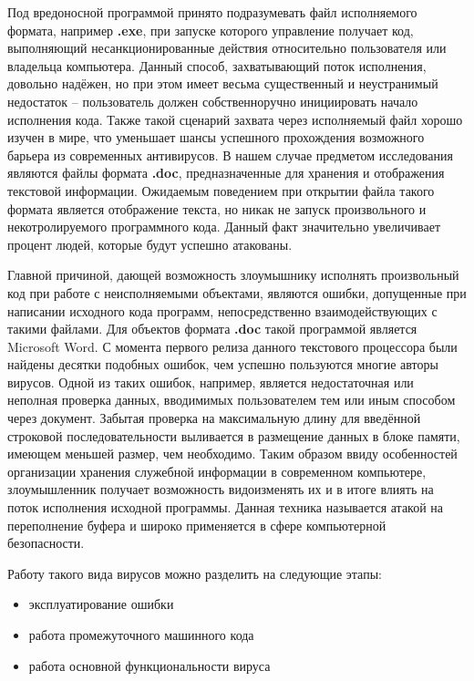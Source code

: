Под вредоносной программой принято подразумевать файл исполняемого формата, например \textbf{.exe}, при запуске которого управление получает код, выполняющий несанкционированные действия относительно пользователя или владельца компьютера. 
Данный способ, захватывающий поток исполнения, довольно надёжен, но при этом имеет весьма существенный и неустранимый недостаток -- пользователь должен собственноручно инициировать начало исполнения кода.
Также такой сценарий захвата через исполняемый файл хорошо изучен в мире, что уменьшает шансы успешного прохождения возможного барьера из современных антивирусов.
В нашем случае предметом исследования являются файлы формата \textbf{.doc}, предназначенные для хранения и отображения текстовой информации. 
Ожидаемым поведением при открытии файла такого формата является отображение текста, но никак не запуск произвольного и некотролируемого программного кода.
Данный факт значительно увеличивает процент людей, которые будут успешно атакованы.

Главной причиной, дающей возможность злоумышнику исполнять произвольный код при работе с неисполняемыми объектами, являются ошибки, допущенные при написании исходного кода программ, непосредственно взаимодействующих с такими файлами. 
Для объектов формата \textbf{.doc} такой программой является Microsoft Word.
С момента первого релиза данного текстового процессора были найдены десятки подобных ошибок, чем успешно пользуются многие авторы вирусов.
Одной из таких ошибок, например, является недостаточная или неполная проверка данных, вводимимых пользователем тем или иным способом через документ.
Забытая проверка на максимальную длину для введённой строковой последовательности выливается в размещение данных в блоке памяти, имеющем меньшей размер, чем необходимо. 
Таким образом ввиду особенностей организации хранения служебной информации в современном компьютере, злоумышленник получает возможность видоизменять их и в итоге влиять на поток исполнения исходной программы.
Данная техника называется атакой на переполнение буфера и широко применяется в сфере компьютерной безопасности.

Работу такого вида вирусов можно разделить на следующие этапы:

\begin{itemize}
\item эксплуатирование ошибки
\item работа промежуточного машинного кода
\item работа основной функциональности вируса
\end{itemize}

